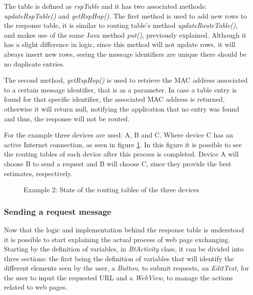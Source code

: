 The table is defined as \textit{rspTable} and it has two associated methods: \textit{updateRspTable()} and \textit{getRspHop()}. The first method is used to add new rows to the response table, it is similar to routing table's method \textit{updateRouteTable()}, and makes use of the same Java method \textit{put()}, previously explained. Although it has a slight difference in logic, since this method will not update rows, it will always insert new rows, seeing the message identifiers are unique there should be no duplicate entries.

The second method, \textit{getRspHop()} is used to retrieve the \gls{MAC} address associated to a certain message identifier, that is as a parameter. In case a table entry is found for that specific identifier, the associated \gls{MAC} address is returned, otherwise it will return null, notifying the application that no entry was found and thus, the response will not be routed.

For the example three devices are used: A, B and C. Where device C has an active Internet connection, as seen in figure \ref{fig:example1.0}. In this figure it is possible to see the routing tables of each device after this process is completed. Device A will choose B to send a request and B will choose C, since they provide the best estimates, respectively.

\begin{figure}[ht]
   \noindent{}
	\caption{\label{fig:example1.0} Example 2: State of the routing tables of the three devices}
\end{figure}

\subsubsection{Sending a request message}
\label{subsubsec:sendrqt}

Now that the logic and implementation behind the response table is understood it is possible to start explaining the actual process of web page exchanging. Starting by the definition of variables, in \textit{BtActivity} class, it can be divided into three sections: the first being the definition of variables that will identify the different elements seen by the user, a \textit{Button}, to submit requests, an \textit{EditText}, for the user to input the requested \gls{URL} and a \textit{WebView}, to manage the actions related to web pages.

